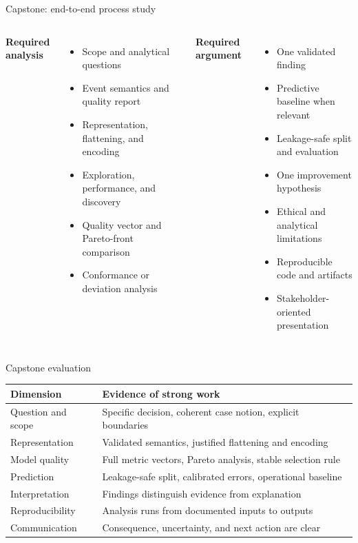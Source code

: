 \documentclass[aspectratio=169,11pt]{beamer}
\begin{document}
\begin{frame}{Capstone: end-to-end process study}
  \begin{columns}[T,onlytextwidth]
      \textbf{Required analysis}
      \begin{itemize}
        \item Scope and analytical questions
        \item Event semantics and quality report
        \item Representation, flattening, and encoding
        \item Exploration, performance, and discovery
        \item Quality vector and Pareto-front comparison
        \item Conformance or deviation analysis
      \end{itemize}
      \textbf{Required argument}
      \begin{itemize}
        \item One validated finding
        \item Predictive baseline when relevant
        \item Leakage-safe split and evaluation
        \item One improvement hypothesis
        \item Ethical and analytical limitations
        \item Reproducible code and artifacts
        \item Stakeholder-oriented presentation
      \end{itemize}
  \end{columns}
\end{frame}

\begin{frame}{Capstone evaluation}
  \small
  \begin{tabular}{@{}p{}p{}@{}}
    \toprule
    Dimension & Evidence of strong work\\
    \midrule
    Question and scope & Specific decision, coherent case notion, explicit boundaries\\
    Representation & Validated semantics, justified flattening and encoding\\
    Model quality & Full metric vectors, Pareto analysis, stable selection rule\\
    Prediction & Leakage-safe split, calibrated errors, operational baseline\\
    Interpretation & Findings distinguish evidence from explanation\\
    Reproducibility & Analysis runs from documented inputs to outputs\\
    Communication & Consequence, uncertainty, and next action are clear\\
    \bottomrule
  \end{tabular}
\end{frame}
\end{document}
